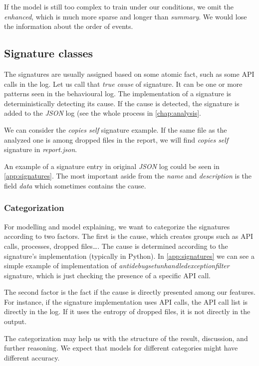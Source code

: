 If the model is still too complex to train under our conditions, we omit the \emph{enhanced}, which is much more sparse and longer than \emph{summary}. We would lose the information about the order of events.

\subsection{Signature classes}
The signatures are usually assigned based on some atomic fact, such as some API calls in the log. Let us call that \emph{true cause} of signature. It can be one or more patterns seen in the behavioural log. The implementation of a signature is deterministically detecting its cause. If the cause is detected, the signature is added to the \emph{JSON} log (see the whole process in \ref{chap:analysis}.

We can consider the \emph{copies self} signature example. If the same file as the analyzed one is among dropped files in the report, we will find \emph{copies self} signature in \emph{report.json}.

An example of a signature entry in original \emph{JSON} log could be seen in \ref{app:signatures}. The most important aside from the \emph{name} and \emph{description} is the field \emph{data} which sometimes contains the cause.

\subsubsection{Categorization}
For modelling and model explaining, we want to categorize the signatures according to two factors. The first is the cause, which creates groups such as API calls, processes, dropped files\dots. The cause is determined according to the signature's implementation (typically in Python). In \ref{app:signatures} we can see a simple example of implementation of \emph{antidebugsetunhandledexceptionfilter} signature, which is just checking the presence of a specific API call.

The second factor is the fact if the cause is directly presented among our features. For instance, if the signature implementation uses API calls, the API call list is directly in the log. If it uses the entropy of dropped files, it is not directly in the output.

The categorization may help us with the structure of the result, discussion, and further reasoning. We expect that models for different categories might have different accuracy.

